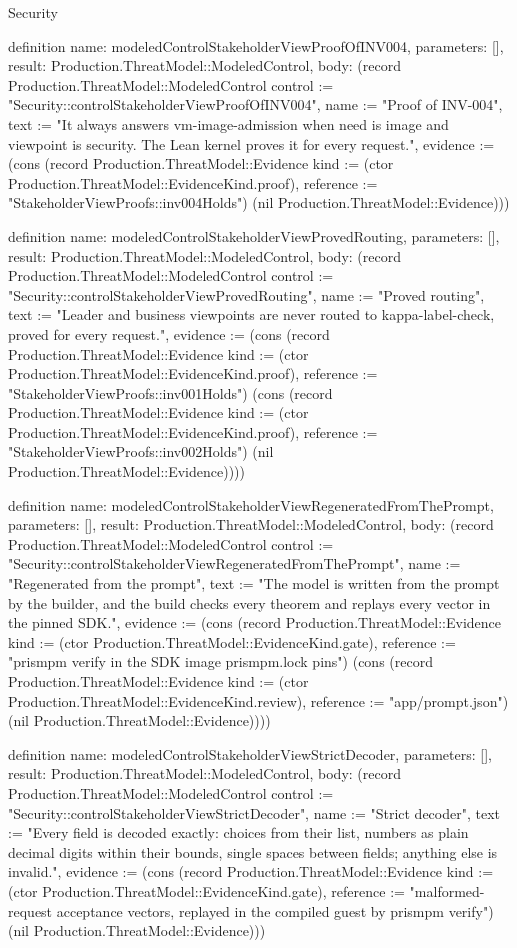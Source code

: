 \begin{lexlean}{Security}
\begin{semanticmodule}
definition{
  name: modeledControlStakeholderViewProofOfINV004,
  parameters: [],
  result: Production.ThreatModel::ModeledControl,
  body: (record Production.ThreatModel::ModeledControl {control := "Security::controlStakeholderViewProofOfINV004", name := "Proof of INV-004", text := "It always answers vm-image-admission when need is image and viewpoint is security. The Lean kernel proves it for every request.", evidence := (cons (record Production.ThreatModel::Evidence {kind := (ctor Production.ThreatModel::EvidenceKind.proof), reference := "StakeholderViewProofs::inv004Holds"}) (nil Production.ThreatModel::Evidence))})
}

definition{
  name: modeledControlStakeholderViewProvedRouting,
  parameters: [],
  result: Production.ThreatModel::ModeledControl,
  body: (record Production.ThreatModel::ModeledControl {control := "Security::controlStakeholderViewProvedRouting", name := "Proved routing", text := "Leader and business viewpoints are never routed to kappa-label-check, proved for every request.", evidence := (cons (record Production.ThreatModel::Evidence {kind := (ctor Production.ThreatModel::EvidenceKind.proof), reference := "StakeholderViewProofs::inv001Holds"}) (cons (record Production.ThreatModel::Evidence {kind := (ctor Production.ThreatModel::EvidenceKind.proof), reference := "StakeholderViewProofs::inv002Holds"}) (nil Production.ThreatModel::Evidence)))})
}

definition{
  name: modeledControlStakeholderViewRegeneratedFromThePrompt,
  parameters: [],
  result: Production.ThreatModel::ModeledControl,
  body: (record Production.ThreatModel::ModeledControl {control := "Security::controlStakeholderViewRegeneratedFromThePrompt", name := "Regenerated from the prompt", text := "The model is written from the prompt by the builder, and the build checks every theorem and replays every vector in the pinned SDK.", evidence := (cons (record Production.ThreatModel::Evidence {kind := (ctor Production.ThreatModel::EvidenceKind.gate), reference := "prismpm verify in the SDK image prismpm.lock pins"}) (cons (record Production.ThreatModel::Evidence {kind := (ctor Production.ThreatModel::EvidenceKind.review), reference := "app/prompt.json"}) (nil Production.ThreatModel::Evidence)))})
}

definition{
  name: modeledControlStakeholderViewStrictDecoder,
  parameters: [],
  result: Production.ThreatModel::ModeledControl,
  body: (record Production.ThreatModel::ModeledControl {control := "Security::controlStakeholderViewStrictDecoder", name := "Strict decoder", text := "Every field is decoded exactly: choices from their list, numbers as plain decimal digits within their bounds, single spaces between fields; anything else is invalid.", evidence := (cons (record Production.ThreatModel::Evidence {kind := (ctor Production.ThreatModel::EvidenceKind.gate), reference := "malformed-request acceptance vectors, replayed in the compiled guest by prismpm verify"}) (nil Production.ThreatModel::Evidence))})
}


\end{semanticmodule}
\end{lexlean}
